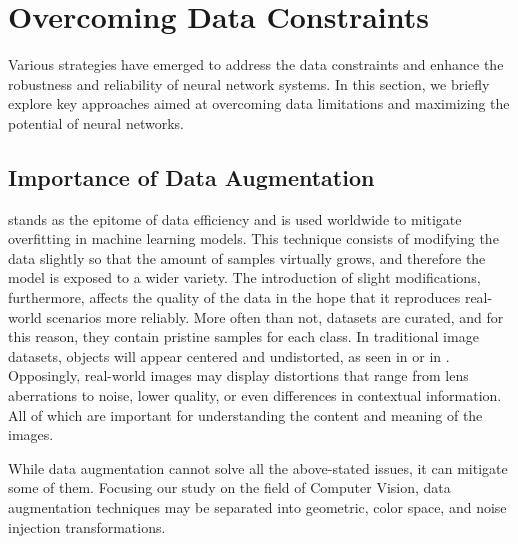 \section{Overcoming Data Constraints}\label{sec:data_constraints}
Various strategies have emerged to address the data constraints and enhance the robustness and reliability of neural network systems. In this section, we briefly explore key approaches aimed at overcoming data limitations and maximizing the potential of neural networks.
\subsection{Importance of Data Augmentation} %
 stands as the epitome of data efficiency and is used worldwide to mitigate overfitting in machine learning models. This technique consists of modifying the data slightly so that the amount of samples virtually grows, and therefore the model is exposed to a wider variety. The introduction of slight modifications, furthermore, affects the quality of the data in the hope that it reproduces real-world scenarios more reliably. More often than not, datasets are curated, and for this reason, they contain pristine samples for each class. In traditional image datasets, objects will appear centered and undistorted, as seen in  or in . Opposingly, real-world images may display distortions that range from lens aberrations to noise, lower quality, or even differences in contextual information. All of which are important for understanding the content and meaning of the images.


While data augmentation cannot solve all the above-stated issues, it can mitigate some of them. Focusing our study on the field of Computer Vision, data augmentation techniques may be separated into geometric, color space, and noise injection transformations.

